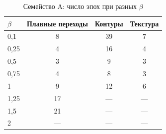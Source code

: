 \begin{table}[H]
\centering
\caption{Семейство A: число эпох при разных $\beta$}
\label{tab:family-a}
\begin{tabular}{@{}lccc@{}}
\hline
$\beta$ & Плавные переходы & Контуры & Текстура \\
\hline
0{,}1 & 8 & 39 & 7 \\
0{,}25 & 4 & 16 & 4 \\
0{,}5 & 3 & 9 & 3 \\
0{,}75 & 4 & 8 & 3 \\
1 & 9 & 12 & 6 \\
1{,}25 & 17 & --- & --- \\
1{,}5 & 21 & --- & --- \\
2 & --- & --- & --- \\
\hline
\end{tabular}
\end{table}
